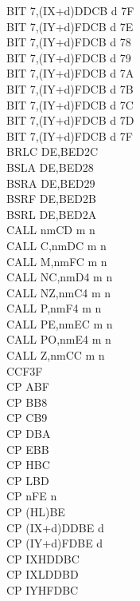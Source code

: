 \begin{multicols}{3}
{\begin{tabbing}
        BIT 7,(IX+d)\UNDOC\>DDCB d 7F\\
        BIT 7,(IY+d)\>FDCB d 7E\\
        BIT 7,(IY+d)\UNDOC\>FDCB d 78\\
        BIT 7,(IY+d)\UNDOC\>FDCB d 79\\
        BIT 7,(IY+d)\UNDOC\>FDCB d 7A\\
        BIT 7,(IY+d)\UNDOC\>FDCB d 7B\\
        BIT 7,(IY+d)\UNDOC\>FDCB d 7C\\
        BIT 7,(IY+d)\UNDOC\>FDCB d 7D\\
        BIT 7,(IY+d)\UNDOC\>FDCB d 7F\\
        BRLC DE,B\ZXN\>ED2C\\
        BSLA DE,B\ZXN\>ED28\\
        BSRA DE,B\ZXN\>ED29\\
        BSRF DE,B\ZXN\>ED2B\\
        BSRL DE,B\ZXN\>ED2A\\
        CALL nm\>CD m n\\
        CALL C,nm\>DC m n\\
        CALL M,nm\>FC m n\\
        CALL NC,nm\>D4 m n\\
        CALL NZ,nm\>C4 m n\\
        CALL P,nm\>F4 m n\\
        CALL PE,nm\>EC m n\\
        CALL PO,nm\>E4 m n\\
        CALL Z,nm\>CC m n\\
        CCF\>3F\\
        CP A\>BF\\
        CP B\>B8\\
        CP C\>B9\\
        CP D\>BA\\
        CP E\>BB\\
        CP H\>BC\\
        CP L\>BD\\
        CP n\>FE n\\
        CP (HL)\>BE\\
        CP (IX+d)\>DDBE d\\
        CP (IY+d)\>FDBE d\\
        CP IXH\UNDOC\>DDBC\\
        CP IXL\UNDOC\>DDBD\\
        CP IYH\UNDOC\>FDBC\\

\end{tabbing}}
\end{multicols}
